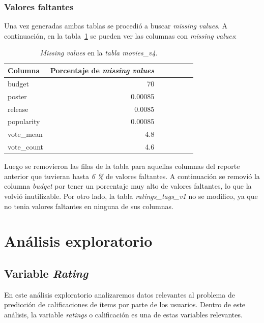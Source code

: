 \documentclass[11pt,a4paper,twoside]{thesis}
\begin{document}
\subsubsection*{Valores faltantes}

Una vez generadas ambas tablas se procedió a buscar \textit{missing values}. A
continuación, en la tabla~\ref{table:tab} se pueden ver las columnas con
\textit{missing values}:

\begin{table}[h!]
	\centering
	\footnotesize
	\begin{tabular}{lrrrrrr}
		\hline
		Columna     & Porcentaje de \textit{missing values} \\
		\hline
		budget      & 70                                    \\
		poster      & 0.00085                               \\
		release     & 0.0085                                \\
		popularity  & 0.00085                               \\
		vote\_mean  & 4.8                                   \\
		vote\_count & 4.6                                   \\
		\hline
	\end{tabular}
	\caption{\textit{Missing values} en la \textit{tabla movies\_v4}.}
	\label{table:tab}
\end{table}

Luego se removieron las filas de la tabla para aquellas columnas del reporte
anterior que tuvieran hasta \textit{6 \%} de valores faltantes. A continuación
se removió la columna \textit{budget} por tener un porcentaje muy alto de
valores faltantes, lo que la volvió inutilizable. Por otro lado, la tabla
\textit{ratings\_tags\_v1} no se modifico, ya que no tenia valores faltantes en
ninguna de sus columnas.

\clearpage

\section{Análisis exploratorio}

\subsection{Variable \textit{Rating}}

En este análisis exploratorio analizaremos datos relevantes al problema de
predicción de calificaciones de ítems por parte de los usuarios. Dentro de este
análisis, la variable \textit{ratings} o calificación es una de estas variables
relevantes.
\end{document}
